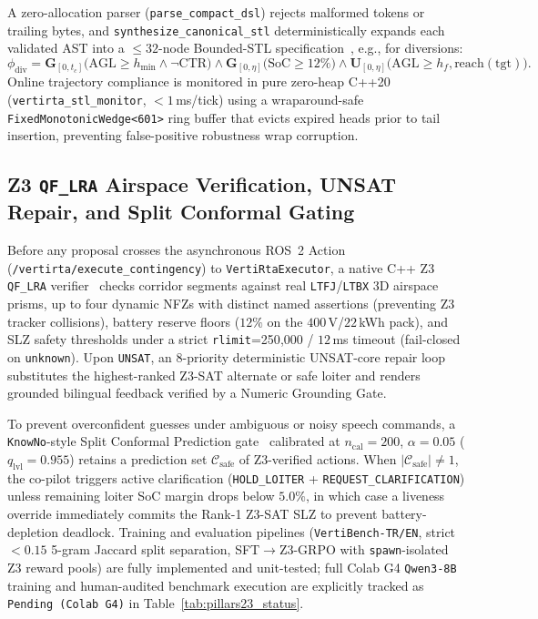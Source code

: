 \documentclass[conference,10pt]{IEEEtran}
\begin{document}
A zero-allocation parser (\texttt{parse\_compact\_dsl}) rejects malformed tokens or trailing bytes, and \texttt{synthesize\_canonical\_stl} deterministically expands each validated AST into a $\le 32$-node Bounded-STL specification~\cite{donze_stl_2010}, e.g., for diversions:
\begin{equation}
  \phi_{\text{div}} = \mathbf{G}_{[0,t_c]}\!\bigl(\text{AGL}\!\ge\!h_{\min} \wedge \neg\text{CTR}\bigr) \wedge \mathbf{G}_{[0,\eta]}\!\bigl(\text{SoC}\!\ge\!12\%\bigr) \wedge \mathbf{U}_{[0,\eta]}\!\bigl(\text{AGL}\!\ge\!h_f,\text{reach}(\text{tgt})\bigr).
  \label{eq:stl_divert}
\end{equation}
Online trajectory compliance is monitored in pure zero-heap C++20 (\texttt{vertirta\_stl\_monitor}, $<1$\,ms/tick) using a wraparound-safe \texttt{FixedMonotonicWedge<601>} ring buffer that evicts expired heads prior to tail insertion, preventing false-positive robustness wrap corruption.

\subsection{Z3 \texttt{QF\_LRA} Airspace Verification, UNSAT Repair, and Split Conformal Gating}

Before any proposal crosses the asynchronous ROS~2 Action (\texttt{/vertirta/execute\_contingency}) to \texttt{VertiRtaExecutor}, a native C++ Z3 \texttt{QF\_LRA} verifier~\cite{demoura_z3_2008} checks corridor segments against real \texttt{LTFJ}/\texttt{LTBX} 3D airspace prisms, up to four dynamic NFZs with distinct named assertions (preventing Z3 tracker collisions), battery reserve floors ($12\%$ on the $400$\,V/$22$\,kWh pack), and SLZ safety thresholds under a strict \texttt{rlimit}=250{,}000 / $12$\,ms timeout (fail-closed on \texttt{unknown}). Upon \texttt{UNSAT}, an 8-priority deterministic UNSAT-core repair loop substitutes the highest-ranked Z3-SAT alternate or safe loiter and renders grounded bilingual feedback verified by a Numeric Grounding Gate.

To prevent overconfident guesses under ambiguous or noisy speech commands, a \texttt{KnowNo}-style Split Conformal Prediction gate~\cite{ren_knowno_2023} calibrated at $n_{\text{cal}}=200$, $\alpha=0.05$ ($q_{\text{lvl}}=0.955$) retains a prediction set $\mathcal{C}_{\text{safe}}$ of Z3-verified actions. When $|\mathcal{C}_{\text{safe}}|\neq 1$, the co-pilot triggers active clarification (\texttt{HOLD\_LOITER} + \texttt{REQUEST\_CLARIFICATION}) unless remaining loiter SoC margin drops below $5.0\%$, in which case a liveness override immediately commits the Rank-1 Z3-SAT SLZ to prevent battery-depletion deadlock. Training and evaluation pipelines (\texttt{VertiBench-TR/EN}, strict $<0.15$ 5-gram Jaccard split separation, SFT$\to$Z3-GRPO with \texttt{spawn}-isolated Z3 reward pools) are fully implemented and unit-tested; full Colab G4 \texttt{Qwen3-8B} training and human-audited benchmark execution are explicitly tracked as \texttt{Pending (Colab G4)} in Table~\ref{tab:pillars23_status}.
\end{document}
